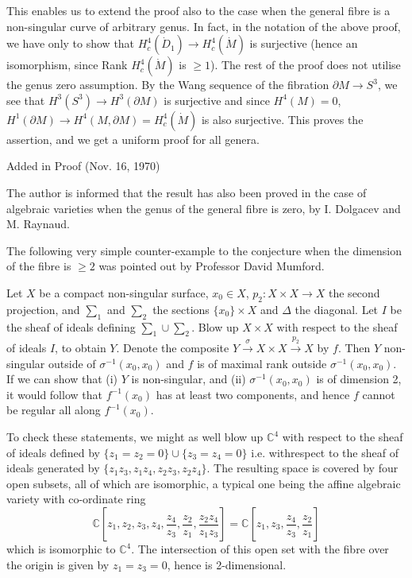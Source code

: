This enables us to extend the proof also to the case when the general fibre is a non-singular curve of arbitrary genus. In fact, in the notation of the above proof, we have only to show that $H^4_c (\dot{D}_1) \to H^4_c (\dot{M})$ is surjective (hence an isomorphism, since Rank $H^4_c (\dot{M})$ is $\geqslant 1$). The rest of the proof does not utilise the genus zero assumption. By the Wang sequence of the fibration $\partial M \to S^3$, we see that $H^3 (S^3) \to H^3 (\partial M)$ is surjective and since $H^4 (M) = 0$, $H^1 (\partial M) \to H^4 (M, \partial M) = H^4_c (\dot{M})$ is also surjective. This proves the assertion, and we get a uniform proof for all genera.

Added in Proof (Nov. 16, 1970)

The author is informed that the result has also been proved in the case of algebraic varieties when the genus of the general fibre is zero, by I. Dolgacev and M. Raynaud.

The following very simple counter-example to the conjecture when the dimension of the fibre is $\geqslant 2$ was pointed out by Professor David Mumford.

Let $X$ be a compact non-singular surface, $x_0 \in X$, $p_2 : X \times X \to X$ the second projection, and $\sum_1$ and $\sum_2$ the sections $\{x_0\} \times X$ and $\Delta$ the diagonal. Let $I$ be the sheaf of ideals defining $\sum_1 \cup \sum_2$. Blow up $X \times X$ with respect to the sheaf of ideals $I$, to obtain $Y$. Denote the composite $Y \xrightarrow{\sigma} X \times X \xrightarrow{p_2} X$ by $f$. Then $Y$ non-singular outside of $\sigma^{-1} (x_0, x_0)$ and $f$ is of maximal rank outside $\sigma^{-1} (x_0, x_0)$. If we can show that (i) $Y$ is non-singular, and (ii) $\sigma^{-1} (x_0, x_0)$ is of dimension 2, it would follow that $f^{-1} (x_0)$ has at least two components, and hence $f$ cannot be regular all along $f^{-1} (x_0)$.

To check these statements, we might as well blow up $\mathbb{C}^4$ with respect to the sheaf of ideals defined by $\{z_1 = z_2 = 0\} \cup \{z_3 = z_4 =0 \}$ i.e. with\pageoriginale respect to the sheaf of ideals generated by $\{z_1 z_3, z_1 z_4, z_2 z_3, z_2 z_4\}$. The resulting space is covered by four open subsets, all of which are isomorphic, a typical one being the affine algebraic variety with co-ordinate ring
$$
\mathbb{C} \left[z_1, z_2, z_3, z_4, \dfrac{z_4}{z_3}, \dfrac{z_2}{z_1}, \dfrac{z_2 z_4}{z_1 z_3} \right] = \mathbb{C} \left[ z_1, z_3, \dfrac{z_4}{z_3} , \dfrac{z_2}{z_1}\right] 
$$ 
which is isomorphic to $\mathbb{C}^4$. The intersection of this open set with the fibre over the origin is given by $z_1 = z_3 = 0$, hence is 2-dimensional.


